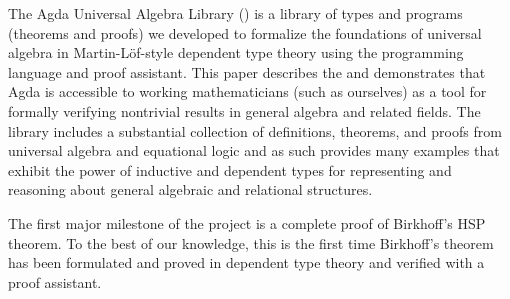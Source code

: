 The Agda Universal Algebra Library (\ualib) is a library of types and programs (theorems and proofs) we developed to formalize the foundations of universal algebra in Martin-Löf-style dependent type theory using the \agda programming language and proof assistant. This paper describes the \ualib and demonstrates that Agda is accessible to working mathematicians (such as ourselves) as a tool for formally verifying nontrivial results in general algebra and related fields. The library includes a substantial collection of definitions, theorems, and proofs from universal algebra and equational logic and as such provides many examples that exhibit the power of inductive and dependent types for representing and reasoning about general algebraic and relational structures.

The first major milestone of the \ualib project is a complete proof of Birkhoff's HSP theorem. To the best of our knowledge, this is the first time Birkhoff's theorem has been formulated and proved in dependent type theory and verified with a proof assistant.

